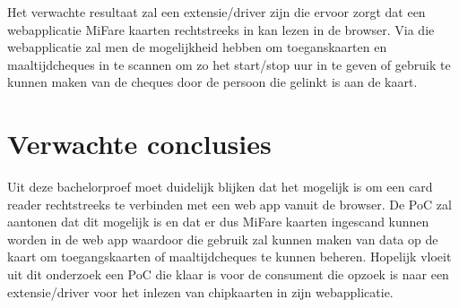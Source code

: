 Het verwachte resultaat zal een extensie/driver zijn die ervoor zorgt dat een webapplicatie MiFare kaarten rechtstreeks in kan lezen in de browser. Via die webapplicatie zal men de mogelijkheid hebben om toeganskaarten en maaltijdcheques in te scannen om zo het start/stop uur in te geven of gebruik te kunnen maken van de cheques door de persoon die gelinkt is aan de kaart.

\section{Verwachte conclusies}%
\label{sec:Verwachte_conclusies}

Uit deze bachelorproef moet duidelijk blijken dat het mogelijk is om een card reader rechtstreeks te verbinden met een web app vanuit de browser. De PoC zal aantonen dat dit mogelijk is en dat er dus MiFare kaarten ingescand kunnen worden in de web app waardoor die gebruik zal kunnen maken van data op de kaart om toegangskaarten of maaltijdcheques te kunnen beheren. Hopelijk vloeit uit dit onderzoek een PoC die klaar is voor de consument die opzoek is naar een extensie/driver voor het inlezen van chipkaarten in zijn webapplicatie.